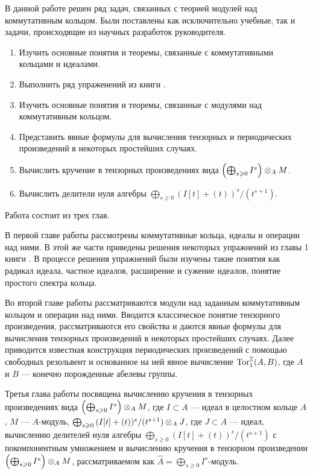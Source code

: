 В данной работе решен ряд задач, связанных с теорией модулей над коммутативным кольцом.
Были поставлены как исключительно учебные, так и задачи, происходящие из научных разработок руководителя.
\begin{enumerate}
    \item Изучить основные понятия и теоремы, связанные с коммутативными кольцами и идеалами.
    \item Выполнить ряд упраженений из книги \cite{A-M}.
    \item Изучить основные понятия и теоремы, связанные с модулями над коммутативным кольцом.
    \item Представить явные формулы для вычисления тензорных и периодических произведений в некоторых 
          простейших случаях.
    \item Вычислить кручение в тензорных произведениях вида $\left(\bigoplus_{s \geqslant 0} I^s \right) \otimes_A M$.
    \item Вычислить делители нуля алгебры $\bigoplus_{s \geq 0}{(I[t] + (t))^s / (t^{s + 1})}$.
\end{enumerate}
Работа состоит из трех глав.

В первой главе работы рассмотрены коммутативные кольца, идеалы и операции над ними. В этой же части приведены решения некоторых упражнений из главы 1 книги \cite{A-M}. В процессе 
решения упражнений были изучены такие понятия как радикал идеала, частное идеалов, расширение и сужение идеалов, понятие простого спектра кольца.

Во второй главе работы рассматриваются модули над заданным коммутативным кольцом и операции над ними. 
Вводится классическое понятие тензорного произведения, рассматриваются его свойства и даются 
явные формулы для вычисления тензорных произведений в некоторых простейших случаях. 
Далее приводится известная конструкция периодических произведений с помощью свободных резольвент и 
основанное на ней явное вычисление $\textup{Tor}_1^{\mathbb{Z}}(A, B)$, где $A$ и $B$ --- конечно порожденные абелевы группы.

Третья глава работы посвящена вычислению кручения в тензорных произведениях вида
$\left(\bigoplus_{s \geqslant 0} I^s \right) \otimes_A M$, где $I \subset A$ --- идеал в целостном кольце $A$, $M$ ---
$A$-модуль, $\bigoplus_{s \geqslant 0}{(I[t] + (t))^s / (t^{s + 1})} \otimes_A J$, где $J \subset A$ --- идеал,
вычислению делителей нуля алгебры $\bigoplus_{s \geq 0}{(I[t] + (t))^s / (t^{s + 1})}$ с покомпонентным
умножением и вычислению кручения в тензорном произведении $\left(\bigoplus_{s \geqslant 0} I^s \right) \otimes_A M$, 
рассматриваемом как $\hat A = \bigoplus_{s \ge 0} I^s$-модуль.
